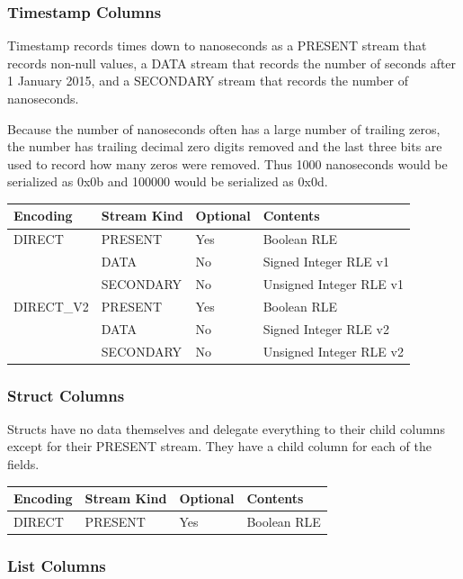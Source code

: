 \documentclass{article}
\begin{document}
\subsubsection{Timestamp Columns}

Timestamp records times down to nanoseconds as a PRESENT stream that
records non-null values, a DATA stream that records the number of
seconds after 1 January 2015, and a SECONDARY stream that records the
number of nanoseconds.

Because the number of nanoseconds often has a large number of trailing
zeros, the number has trailing decimal zero digits removed and the
last three bits are used to record how many zeros were removed. Thus
1000 nanoseconds would be serialized as 0x0b and 100000 would be
serialized as 0x0d.

\vspace{10pt}
\begin{tabular}{| l | l | l | l |}
\hline
Encoding & Stream Kind & Optional & Contents \\
\hline
DIRECT & PRESENT   & Yes & Boolean RLE\\
       & DATA      & No  & Signed Integer RLE v1\\
       & SECONDARY & No  & Unsigned Integer RLE v1\\
\hline
DIRECT\_V2 & PRESENT   & Yes & Boolean RLE\\
           & DATA      & No  & Signed Integer RLE v2\\
           & SECONDARY & No  & Unsigned Integer RLE v2\\
\hline
\end{tabular}

\subsubsection{Struct Columns}

Structs have no data themselves and delegate everything to their child
columns except for their PRESENT stream. They have a child column
for each of the fields.

\vspace{10pt}
\begin{tabular}{| l | l | l | l |}
\hline
Encoding & Stream Kind & Optional & Contents \\
\hline
DIRECT & PRESENT & Yes & Boolean RLE\\
\hline
\end{tabular}

\subsubsection{List Columns}
\end{document}

